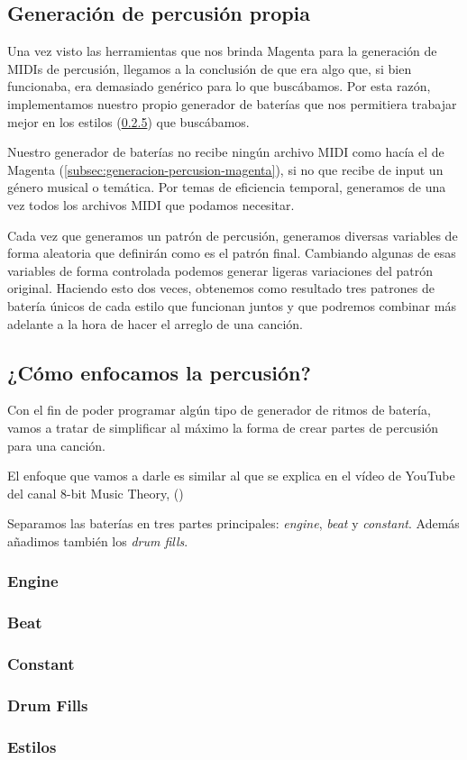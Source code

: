     \subsection{Generación de percusión propia}
    \label{subsec:generacion-percusion-propia}
    Una vez visto las herramientas que nos brinda Magenta para la generación de MIDIs de percusión, llegamos a la conclusión de que era algo que, si bien funcionaba, era demasiado genérico para lo que buscábamos. Por esta razón, implementamos nuestro propio generador de baterías que nos permitiera trabajar mejor en los estilos (\ref{subsubsec:estilos-percusion}) que buscábamos.

    Nuestro generador de baterías no recibe ningún archivo MIDI como hacía el de Magenta (\ref{subsec:generacion-percusion-magenta}), si no que recibe de input un género musical o temática. Por temas de eficiencia temporal, generamos de una vez todos los archivos MIDI que podamos necesitar. 
    
    Cada vez que generamos un patrón de percusión, generamos diversas variables de forma aleatoria que definirán como es el patrón final. Cambiando algunas de esas variables de forma controlada podemos generar ligeras variaciones del patrón original. Haciendo esto dos veces, obtenemos como resultado tres patrones de batería únicos de cada estilo que funcionan juntos y que podremos combinar más adelante a la hora de hacer el arreglo de una canción.

    \subsection{¿Cómo enfocamos la percusión?}

    Con el fin de poder programar algún tipo de generador de ritmos de batería, vamos a tratar de simplificar al máximo la forma de crear partes de percusión para una canción.

    El enfoque que vamos a darle es similar al que se explica en el vídeo de YouTube del canal 8-bit Music Theory, (\cite{DrumPartsForNoDrummers})

    Separamos las baterías en tres partes principales: \textit{engine}, \textit{beat} y \textit{constant}. Además añadimos también los \textit{drum fills}.

    \subsubsection{Engine}
    
    \subsubsection{Beat}
    \subsubsection{Constant}
    \subsubsection{Drum Fills}
    \label{subsubsec:drum-fills}
    \subsubsection{Estilos}
    \label{subsubsec:estilos-percusion}
    
    